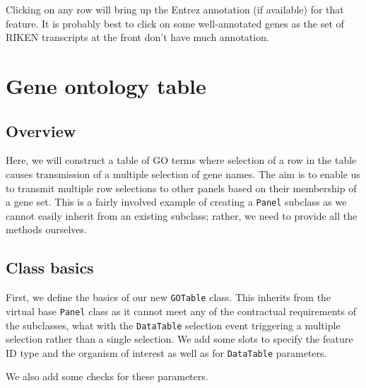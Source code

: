 \documentclass[]{book}
\begin{document}
Clicking on any row will bring up the Entrez annotation (if available)
for that feature. It is probably best to click on some well-annotated
genes as the set of RIKEN transcripts at the front don't have much
annotation.

\chapter{Gene ontology table}\label{gene-ontology-table}

\section{Overview}\label{overview-4}

Here, we will construct a table of GO terms where selection of a row in
the table causes transmission of a multiple selection of gene names. The
aim is to enable us to transmit multiple row selections to other panels
based on their membership of a gene set. This is a fairly involved
example of creating a \texttt{Panel} subclass as we cannot easily
inherit from an existing subclass; rather, we need to provide all the
methods ourselves.

\section{Class basics}\label{class-basics-3}

First, we define the basics of our new \texttt{GOTable} class. This
inherits from the virtual base \texttt{Panel} class as it cannot meet
any of the contractual requirements of the subclasses, what with the
\texttt{DataTable} selection event triggering a multiple selection
rather than a single selection. We add some slots to specify the feature
ID type and the organism of interest as well as for \texttt{DataTable}
parameters.

We also add some checks for these parameters.
\end{document}
